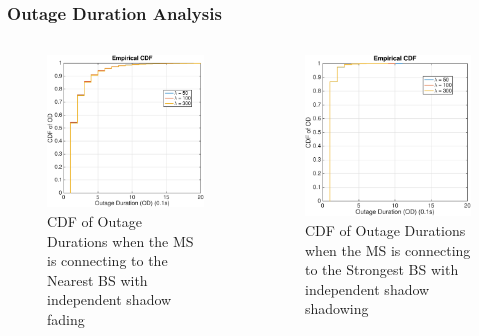 \documentclass{beamer}
\begin{document}
\begin{frame}
\frametitle{Outage Duration Analysis}
\begin{columns}[c]
 \begin{figure}
 \centering
 \includegraphics[width=5cm]{ODthresh-5iidNB.eps}
 \caption{CDF of Outage Durations when the MS is connecting to the Nearest BS with independent shadow fading}
 \label{iid1}
 \end{figure}
 \begin{figure}
 \centering
 \includegraphics[width=5cm]{ODthresh-5iidMax.eps}
 \caption{CDF of Outage Durations when the MS is connecting to the Strongest BS with independent shadow shadowing}
 \label{iid2}
 \end{figure}
 \end{columns}
 \end{frame}
\end{document}

